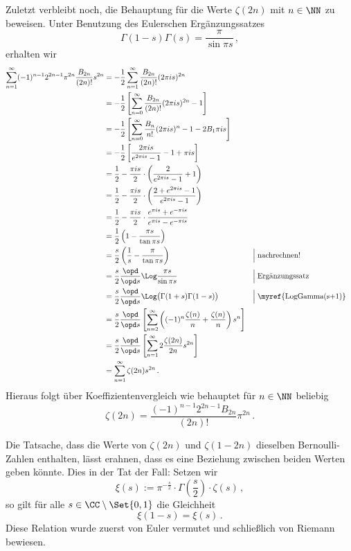 \begin{bewe}
Zuletzt verbleibt noch, die Behauptung für die Werte $\zeta(2n)$ mit $n \in \NN$ zu beweisen. Unter Benutzung des Eulerschen Ergänzungssatzes
\[
	\Gamma(1-s) \Gamma(s) = \frac \pi{\sin \pi s}
	\,,
\]
erhalten wir
\begin{align*}
	\sum_{n=1}^\infty (-1)^{n-1} 2^{2n-1} \pi^{2n} \frac {B_{2n}}{(2n)!} s^{2n}
	&= - \frac 12 \sum_{n=1}^\infty \frac {B_{2n}}{(2n)!} (2\pi is)^{2n} \\
	&= - \frac 12 \left[ \sum_{n=0}^\infty \frac {B_{2n}}{(2n)!} (2\pi is)^{2n} - 1 \right] \\
	&= - \frac 12 \left[ \sum_{n=0}^\infty \frac {B_n}{n!} (2\pi is)^n - 1 - 2 B_1 \pi i s \right] \\
	&= - \frac 12 \left[ \frac {2\pi is}{e^{2\pi is} - 1} - 1 + \pi is \right] \\
	&= \frac 12 - \frac {\pi is}2 \cdot \left( \frac 2{e^{2\pi is} - 1} + 1 \right) \\
	&= \frac 12 - \frac {\pi is}2 \cdot \left( \frac {2 + e^{2\pi is} - 1}{e^{2\pi is} - 1} \right) \\
	&= \frac 12 - \frac {\pi is}2 \cdot \frac {e^{\pi is} + e^{-\pi is}}{e^{\pi is} - e^{-\pi is}} \\
	&= \frac 12 \left( 1 - \frac {\pi s}{\tan \pi s} \right) \\
	&= \frac s2 \left( \frac 1s - \frac \pi{\tan \pi s} \right) && \Big| \; \text{nachrechnen!} \\
	&= \frac s2 \frac {\opd}{\opd s} \Log \frac {\pi s}{\sin \pi s} && \Big| \; \text{Ergänzungssatz} \\
	&= \frac s2 \frac {\opd}{\opd s} \Log \big( \Gamma(1+s) \Gamma(1-s) \big) && \Big| \; \text{\myref{LogGamma(s+1)}} \\
	&= \frac s2 \frac {\opd}{\opd s} \left[ \sum_{n=2}^\infty \left( (-1)^n \frac {\zeta(n)}n + \frac {\zeta(n)}n \right) s^n \right] \\
	&= \frac s2 \frac {\opd}{\opd s} \left[ \sum_{n=1}^\infty 2\frac {\zeta(2n)}{2n} s^{2n} \right] \\
	&= \sum_{n=1}^\infty \zeta(2n) s^{2n}
	\,.
\end{align*}
Hieraus folgt über Koeffizientenvergleich wie behauptet für $n \in \NN$ beliebig
\[
	\zeta(2n) = \frac {(-1)^{n-1} 2^{2n-1} B_{2n}}{(2n)!} \pi^{2n} 
	\,.
\]
\end{bewe}

Die Tatsache, dass die Werte von $\zeta(2n)$ und $\zeta(1-2n)$ dieselben Bernoulli-Zahlen enthalten, lässt erahnen, dass es eine Beziehung zwischen beiden Werten geben könnte. Dies in der Tat der Fall: Setzen wir 
\[
	\xi(s) := \pi^{- \frac s2} \cdot \Gamma \! \left( \frac s2 \right) \cdot \zeta(s)
	\,,
\]
so gilt für alle $s \in \CC \setminus \Set {0,1}$ die Gleichheit
\begin{equation}\label{eq:Xi-Beziehung}
	\xi(1-s) = \xi(s)
	\,.
\end{equation}
Diese Relation wurde zuerst von Euler vermutet und schließlich von Riemann bewiesen.

